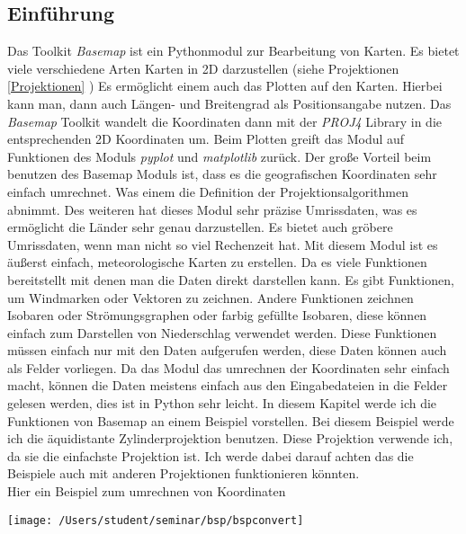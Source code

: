 \subsection{Einführung}
Das Toolkit \emph{Basemap} ist ein Pythonmodul zur Bearbeitung von Karten.
Es bietet viele verschiedene Arten Karten in 2D darzustellen (siehe Projektionen \ref{Projektionen} )
Es ermöglicht einem auch das Plotten auf den Karten. Hierbei kann man, dann auch Längen- und Breitengrad als Positionsangabe nutzen. Das \emph{Basemap} Toolkit wandelt die Koordinaten dann mit der \emph{PROJ4} Library in die entsprechenden 2D Koordinaten um. Beim Plotten greift das Modul auf Funktionen des Moduls \emph{pyplot} und \emph{matplotlib} zurück. Der große Vorteil beim benutzen des \textsf{Basemap} Moduls ist, dass es die geografischen Koordinaten sehr einfach umrechnet. Was einem die Definition der Projektionsalgorithmen abnimmt. Des weiteren hat dieses Modul sehr präzise Umrissdaten, was es ermöglicht die Länder sehr genau darzustellen. Es bietet auch gröbere Umrissdaten, wenn man nicht so viel Rechenzeit hat. Mit diesem Modul ist es äußerst einfach, meteorologische Karten zu erstellen. Da es viele Funktionen bereitstellt mit denen man die Daten direkt darstellen kann. Es gibt Funktionen, um Windmarken oder Vektoren zu zeichnen. Andere Funktionen zeichnen Isobaren oder Strömungsgraphen oder farbig gefüllte Isobaren, diese können einfach zum Darstellen von Niederschlag verwendet werden. Diese Funktionen müssen einfach nur mit den Daten aufgerufen werden, diese Daten können auch als Felder vorliegen. Da das Modul das umrechnen der Koordinaten sehr einfach macht, können die Daten meistens einfach aus den Eingabedateien in die Felder gelesen werden, dies ist in \textsf{Python} sehr leicht.
 In diesem Kapitel werde ich die Funktionen von \textsf{Basemap} an einem Beispiel vorstellen. Bei diesem Beispiel werde ich die äquidistante Zylinderprojektion benutzen. Diese Projektion verwende ich, da sie die einfachste Projektion ist. Ich werde dabei darauf achten das die Beispiele auch mit anderen Projektionen funktionieren könnten.\\
 Hier ein Beispiel zum umrechnen von Koordinaten

\texttt{[image: /Users/student/seminar/bsp/bspconvert]} 